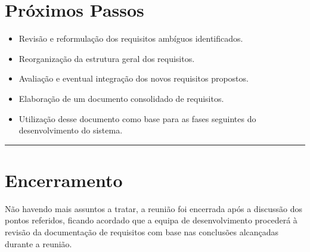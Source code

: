 \documentclass[12pt]{article}
\begin{document}
\vspace{0.5cm}

\section*{Próximos Passos}

\begin{itemize}
\item Revisão e reformulação dos requisitos ambíguos identificados.
\item Reorganização da estrutura geral dos requisitos.
\item Avaliação e eventual integração dos novos requisitos propostos.
\item Elaboração de um documento consolidado de requisitos.
\item Utilização desse documento como base para as fases seguintes do desenvolvimento do sistema.
\end{itemize}

\vspace{0.5cm}
\hrule %
\vspace{0.2cm}

\section*{Encerramento}

Não havendo mais assuntos a tratar, a reunião foi encerrada após a discussão dos pontos referidos, ficando acordado que a equipa de desenvolvimento procederá à revisão da documentação de requisitos com base nas conclusões alcançadas durante a reunião.
\end{document}
